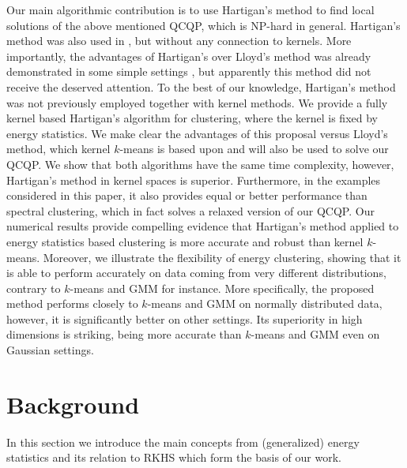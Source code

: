 \documentclass[twoside]{article}
\begin{document}
Our main 
algorithmic contribution is to use Hartigan's method \citep{Hartigan} to 
find local solutions of the above mentioned QCQP, which is NP-hard in general.
Hartigan's method was also used in \citep{Kgroups}, but without any
connection to kernels. More importantly, the 
advantages of Hartigan's
over Lloyd's method was already demonstrated 
in some simple settings
\citep{Telgarsky,Slonin}, but apparently this method did not receive 
the deserved attention. To the 
best of our knowledge, Hartigan's method was not previously 
employed together with kernel methods. 
We provide a fully kernel based Hartigan's algorithm for clustering,
where the kernel is fixed by energy statistics. 
We make clear the advantages of this proposal versus 
Lloyd's method, which kernel $k$-means is based upon and will also be used 
to solve our QCQP. We show that both algorithms  have the same
time complexity, however, Hartigan's method in kernel spaces is superior. 
Furthermore, in the examples considered in this paper, it 
also provides equal or better performance than spectral clustering,
which in fact solves a relaxed version of our QCQP.
Our numerical results provide compelling evidence that 
Hartigan's method applied to energy statistics based clustering
is more accurate and robust than 
kernel $k$-means. Moreover, we illustrate the
flexibility of energy clustering,  
showing that it is able to perform accurately on data coming from 
very different distributions, contrary to $k$-means and GMM for instance.
More specifically, the proposed method performs 
closely to $k$-means and GMM on normally distributed data, however,
it is significantly better on other settings. 
Its superiority in high dimensions is striking, being more accurate 
than $k$-means and GMM even on Gaussian settings.


\section{Background}
\label{sec:background}

In this section we introduce the main concepts from (generalized) energy
statistics \citep{Szkely2013,Lyons} and its relation to 
RKHS \citep{Sejdinovic2013}
which form the basis of our work.
\end{document}

